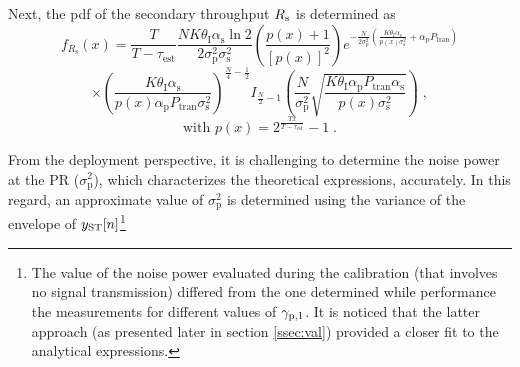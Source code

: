Next, the pdf of the secondary throughput $R_{\text{s}}$ is determined as
\begin{equation}
	\label{Rspdf}
	f_{R_\textrm{s}}\left(x\right) =
	\frac{T}{T-\tau_\textrm{est}}\frac{N K \theta_\textrm{I} \alpha_\textrm{s} \ln{2}}{2 \sigma_\textrm{p}^2 \sigma_\textrm{s}^2} 
	\left(\frac{p\left(x\right)+1}{\left[p\left(x\right)\right]^2} \right)
	e^{-\frac{N}{2 \sigma_\textrm{p}^2} \left(\frac{K \theta_\textrm{I} \alpha_\textrm{s}}{p\left(x\right)\sigma_\textrm{s}^2} + \alpha_\textrm{p} P_\textrm{tran} \right)}
\end{equation}
\begin{equation*}
	\times \left(\frac{K \theta_\textrm{I} \alpha_\textrm{s}}{p\left(x\right) \alpha_\textrm{p} P_\textrm{tran}\sigma_\textrm{s}^2}\right)^{\frac{N}{4}-\frac{1}{2}}
	I_{\frac{N}{2}-1}\left(\frac{N}{\sigma_\textrm{p}^2}\sqrt{\frac{K \theta_\textrm{I} \alpha_\textrm{p} P_\textrm{tran} \alpha_\textrm{s}}{p\left(x\right) \sigma_\textrm{s}^2}}\right) \;  ,
\end{equation*}
\begin{equation*}
\text{with } p\left(x\right) = 2^\frac{Tx}{T-\tau_\textrm{est}}-1 \;  .
\end{equation*} 



From the deployment perspective, it is challenging to determine the noise power at the PR ($\sigma_\textrm{p}^2$), which characterizes the theoretical expressions, accurately. In this regard, an approximate value of $\sigma_\textrm{p}^2$ is determined using the variance of the envelope of $y_{\text{ST}}[n]$\footnote{The value of the noise power evaluated during the calibration (that involves no signal transmission) differed from the one determined while performance the measurements for different values of ${\gamma}_{\text{p,1}}$. It is noticed that the latter approach (as presented later in section \ref{ssec:val}) provided a closer fit to the analytical expressions.}

